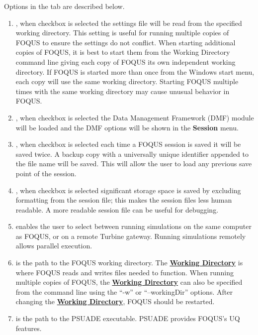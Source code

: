 Options in the  tab are described below.
\begin{enumerate}
	\item  {}, when checkbox is selected the settings file will be read from the specified working directory. This setting is useful for running multiple copies of FOQUS to ensure the settings do not conflict. When starting additional copies of FOQUS, it is best to start them from the Working Directory command line giving each copy of FOQUS its own independent working directory. If FOQUS is started more than once from the Windows start menu, each copy will use the same working directory. Starting FOQUS multiple times with the same working directory may cause unusual behavior in FOQUS.
	\item {}, when checkbox is selected the Data Management Framework (DMF) module will be loaded and the DMF options will be shown in the \textbf{Session\underline{}} menu.
	\item {}, when checkbox is selected each time a FOQUS session is saved it will be saved twice. A backup copy with a universally unique identifier appended to the file name will be saved.  This will allow the user to load any previous save point of the session.
	\item {}, when checkbox is selected significant storage space is saved by excluding formatting from the session file; this makes the session files less human readable. A more readable session file can be useful for debugging.
	\item {} enables the user to select between running simulations on the same computer as FOQUS, or on a remote Turbine gateway. Running simulations remotely allows parallel execution.
	\item {} is the path to the FOQUS working directory. The \textbf{\underline{Working Directory}} is where FOQUS reads and writes files needed to function. When running multiple copies of FOQUS, the \textbf{\underline{Working Directory}} can also be specified from the command line using the ``-w'' or ``--workingDir'' options. After changing the \textbf{\underline{Working Directory}}, FOQUS should be restarted.
	\item {} is the path to the PSUADE executable. PSUADE provides FOQUS's UQ features.

\end{enumerate}
